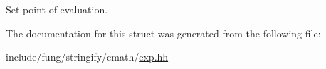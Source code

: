 Set point of evaluation. 



The documentation for this struct was generated from the following file\-:\begin{DoxyCompactItemize}
\item 
include/fung/stringify/cmath/\hyperlink{stringify_2cmath_2exp_8hh}{exp.\-hh}\end{DoxyCompactItemize}
